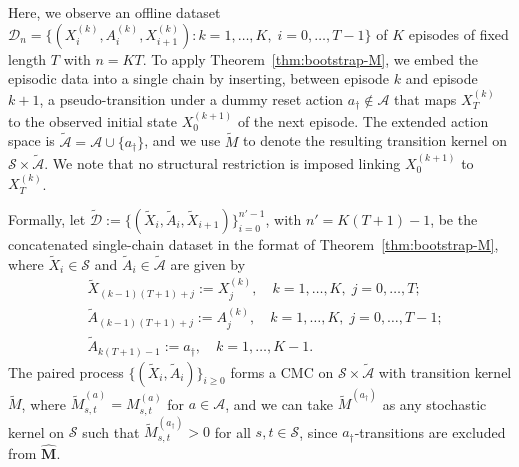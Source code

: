 \documentclass{article}
\numberwithin{equation}{section}
\begin{document}
Here, we observe an offline dataset $\mathcal{D}_n = \bigl\{(X^{(k)}_i, A^{(k)}_i, X^{(k)}_{i+1}): k = 1,\dots,K,\; i = 0,\dots,T-1 \bigr\}$ of $K$ episodes of fixed length $T$ with $n=KT$.
To apply Theorem~\ref{thm:bootstrap-M}, we embed the episodic data into a single chain by inserting, between episode $k$ and episode $k+1$, a pseudo-transition under a dummy reset action $a_\dagger\notin\mathcal{A}$ that maps $X_T^{(k)}$ to the observed initial state $X_0^{(k+1)}$ of the next episode.
The extended action space is $\widetilde{\mathcal{A}}=\mathcal{A}\cup\{a_\dagger\}$, and we use $\widetilde M$ to denote the resulting transition kernel on $\mathcal{S}\times\widetilde{\mathcal{A}}$.
We note that no structural restriction is imposed linking $X_0^{(k+1)}$ to $X_{T}^{(k)}$.

Formally, let $\tilde{\mathcal{D}} := \{(\widetilde{X}_i,\widetilde{A}_i,\widetilde{X}_{i+1})\}_{i=0}^{n'-1}$, with $n'=K(T+1)-1$, be the concatenated single-chain dataset in the format of Theorem~\ref{thm:bootstrap-M}, where $\widetilde{X}_i\in\mathcal{S}$ and $\widetilde{A}_i\in\widetilde{\mathcal{A}}$ are given by 
\[
\begin{aligned}
&\widetilde{X}_{(k-1)(T+1)+j} := X_j^{(k)}, \quad k=1,\ldots,K,\; j=0,\ldots,T; \\
&\widetilde{A}_{(k-1)(T+1)+j} := A_j^{(k)}, \quad k=1,\ldots,K,\; j=0,\ldots,T-1; \\
&\widetilde{A}_{k(T+1)-1} := a_\dagger, \quad k=1,\ldots,K-1.
\end{aligned}
\]
The paired process $\{(\widetilde{X}_i,\widetilde{A}_i)\}_{i \ge 0}$ forms a CMC on $\mathcal{S}\times\widetilde{\mathcal{A}}$ with transition kernel $\widetilde{M}$, where $\widetilde{M}^{(a)}_{s,t} = M^{(a)}_{s,t}$ for $a\in\mathcal{A}$, and we can take $\widetilde{M}^{(a_\dagger)}$ as any stochastic kernel on $\mathcal{S}$ such that $\widetilde{M}^{(a_\dagger)}_{s,t} > 0$ for all $s,t \in \mathcal S$, since $a_\dagger$-transitions are excluded from $\hat{\mathbf{M}}$.
\end{document}
